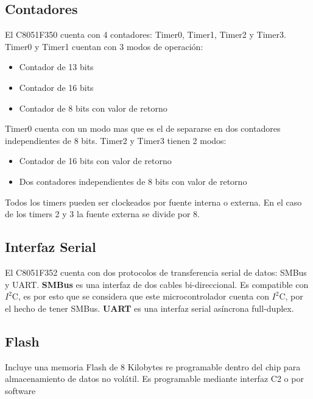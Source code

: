 \subsection{Contadores} %
\label{sub:contadores}

El C8051F350 cuenta con 4 contadores: Timer0, Timer1, Timer2 y Timer3. Timer0 y Timer1 cuentan con 3 modos de operación:
\begin{itemize}
  \item Contador de 13 bits
  \item Contador de 16 bits
  \item Contador de 8 bits con valor de retorno
\end{itemize}
Timer0 cuenta con un modo mas que es el de separarse en dos contadores independientes de 8 bits.
Timer2 y Timer3 tienen 2 modos:
 \begin{itemize}
   \item Contador de 16 bits con valor de retorno
   \item Dos contadores independientes de 8 bits con valor de retorno
 \end{itemize}

Todos los timers pueden ser clockeados por fuente interna o externa. En el caso de los timers 2 y 3 la fuente externa se divide por 8.

\subsection{Interfaz Serial} %
\label{sub:interfaz_serial}

El C8051F352 cuenta con dos protocolos de transferencia serial de datos: SMBus y UART. \textbf{SMBus} es una interfaz de dos cables bi-direccional. Es compatible con $I^{2}$C, es por esto que se considera que este microcontrolador cuenta con $I^{2}$C, por el hecho de tener SMBus. \textbf{UART} es una interfaz serial asíncrona full-duplex.

\subsection{Flash} %
\label{sub:flash}

Incluye una memoria Flash de 8 Kilobytes re programable dentro del chip para almacenamiento de datos no volátil. Es programable mediante interfaz C2 o por software
